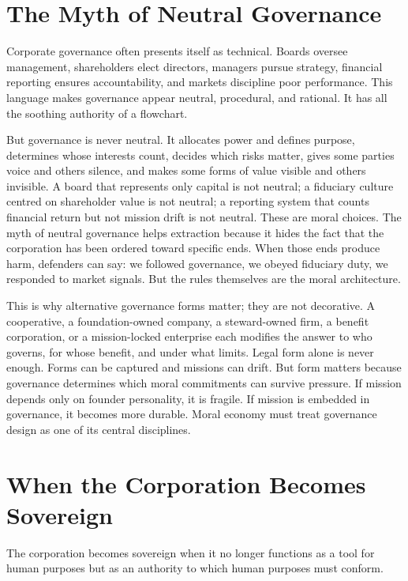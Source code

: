 \documentclass[11pt,a4paper,oneside]{book}
\begin{document}
\section*{The Myth of Neutral Governance}

Corporate governance often presents itself as technical. Boards oversee management, shareholders elect directors, managers pursue strategy, financial reporting ensures accountability, and markets discipline poor performance. This language makes governance appear neutral, procedural, and rational. It has all the soothing authority of a flowchart.

But governance is never neutral. It allocates power and defines purpose, determines whose interests count, decides which risks matter, gives some parties voice and others silence, and makes some forms of value visible and others invisible. A board that represents only capital is not neutral; a fiduciary culture centred on shareholder value is not neutral; a reporting system that counts financial return but not mission drift is not neutral. These are moral choices. The myth of neutral governance helps extraction because it hides the fact that the corporation has been ordered toward specific ends. When those ends produce harm, defenders can say: we followed governance, we obeyed fiduciary duty, we responded to market signals. But the rules themselves are the moral architecture.

This is why alternative governance forms matter; they are not decorative. A cooperative, a foundation-owned company, a steward-owned firm, a benefit corporation, or a mission-locked enterprise each modifies the answer to who governs, for whose benefit, and under what limits. Legal form alone is never enough. Forms can be captured and missions can drift. But form matters because governance determines which moral commitments can survive pressure. If mission depends only on founder personality, it is fragile. If mission is embedded in governance, it becomes more durable. Moral economy must treat governance design as one of its central disciplines.

\section*{When the Corporation Becomes Sovereign}

The corporation becomes sovereign when it no longer functions as a tool for human purposes but as an authority to which human purposes must conform.
\end{document}
